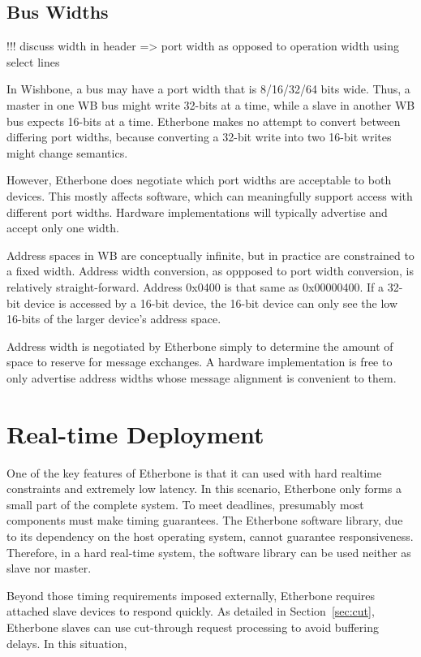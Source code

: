 \documentclass{article}
\begin{document}
\subsection{Bus Widths}

!!! discuss width in header => port width
    as opposed to operation width using select lines

In Wishbone, 
a bus may have a port width that is 8/16/32/64 bits wide.
Thus, a master in one WB bus might write 32-bits at a time,
while a slave in another WB bus expects 16-bits at a time.
Etherbone makes no attempt to convert between differing port widths,
because converting a 32-bit write into two 16-bit writes might change semantics.

However, 
Etherbone does negotiate which port widths are acceptable to both devices.
This mostly affects software,
which can meaningfully support access with different port widths.
Hardware implementations will typically advertise and accept only one width.

Address spaces in WB are conceptually infinite, 
but in practice are constrained to a fixed width.
Address width conversion, as oppposed to port width conversion,
is relatively straight-forward.
Address 0x0400 is that same as 0x00000400.
If a 32-bit device is accessed by a 16-bit device,
the 16-bit device can only see the low 16-bits of the larger device's address space.

Address width is negotiated by Etherbone simply to determine the amount of
space to reserve for message exchanges.
A hardware implementation is free to only advertise address widths
whose message alignment is convenient to them.

\section{Real-time Deployment}
\label{sec:deployment}

One of the key features of Etherbone is that it can used with hard realtime constraints
and extremely low latency.
In this scenario, Etherbone only forms a small part of the complete system.
To meet deadlines, presumably most components must make timing guarantees.
The Etherbone software library, 
due to its dependency on the host operating system,
cannot guarantee responsiveness.
Therefore, in a hard real-time system,
the software library can be used neither as slave nor master.

Beyond those timing requirements imposed externally, 
Etherbone requires attached slave devices to respond quickly.
As detailed in Section~\ref{sec:cut},
Etherbone slaves can use cut-through request processing to avoid buffering delays.
In this situation, 
\end{document}
